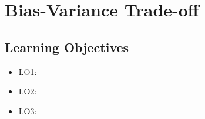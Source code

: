 \documentclass[]{book}
\providecommand{\tightlist}{%
  \setlength{\itemsep}{0pt}\setlength{\parskip}{0pt}}
\begin{document}
\hypertarget{chap-bias-variance}{%
\chapter{Bias-Variance Trade-off}\label{chap-bias-variance}}

\hypertarget{learning-objectives-9}{%
\section*{Learning Objectives}\label{learning-objectives-9}}

\begin{itemize}
\tightlist
\item
  LO1:
\item
  LO2:
\item
  LO3:
\end{itemize}


\end{document}
